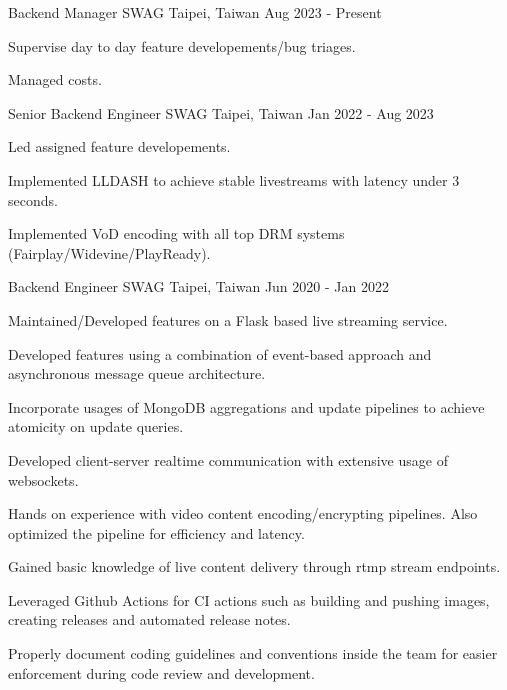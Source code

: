 

\begin{cventries}

  \cventry
    {Backend Manager} %
    {SWAG} %
    {Taipei, Taiwan} %
    {Aug 2023 - Present} %
    {
      \begin{cvitems} %
        \item {Supervise day to day feature developements/bug triages. }
        \item {Managed costs. }
      \end{cvitems}
    }
    {Senior Backend Engineer} %
    {SWAG} %
    {Taipei, Taiwan} %
    {Jan 2022 - Aug 2023} %
    {
      \begin{cvitems} %
        \item {Led assigned feature developements. }
        \item {Implemented LLDASH to achieve stable livestreams with latency under 3 seconds. }
        \item {Implemented VoD encoding with all top DRM systems (Fairplay/Widevine/PlayReady). }
      \end{cvitems}
    }
    {Backend Engineer} %
    {SWAG} %
    {Taipei, Taiwan} %
    {Jun 2020 - Jan 2022} %
    {
      \begin{cvitems} %
        \item {Maintained/Developed features on a Flask based live streaming service. }
        \item {Developed features using a combination of event-based approach and asynchronous message queue architecture. }
        \item {Incorporate usages of MongoDB aggregations and update pipelines to achieve atomicity on update queries. }
        \item {Developed client-server realtime communication with extensive usage of websockets. }
        \item {Hands on experience with video content encoding/encrypting pipelines. Also optimized the pipeline for efficiency and latency. }
        \item {Gained basic knowledge of live content delivery through rtmp stream endpoints.}
        \item {Leveraged Github Actions for CI actions such as building and pushing images, creating releases and automated release notes.}
        \item {Properly document coding guidelines and conventions inside the team for easier enforcement during code review and development. }
      \end{cvitems}
    }


\end{cventries}
